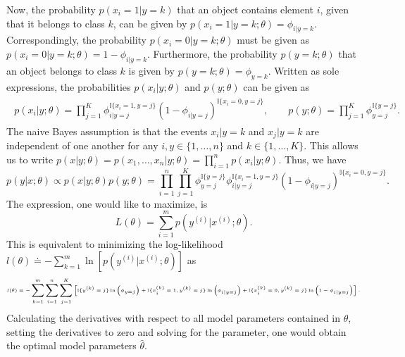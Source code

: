 \documentclass[a4paper,11pt]{article}
\numberwithin{equation}{section}
\begin{document}
{Now, the probability $p(x_i = 1|y=k)$ that an object contains element $i$, given that it belongs to class $k$, can be given by $p(x_i=1|y=k;\theta) = \phi_{i|y=k}$. Correspondingly, the probability $p(x_i=0|y=k;\theta)$ must be given as $p(x_i=0|y=k;\theta) = 1-\phi_{i|y=k}$. Furthermore, the probability $p(y=k;\theta)$ that an object belongs to class $k$ is given by $p(y=k;\theta) = \phi_{y=k}$. Written as sole expressions, the probabilities $p(x_i|y;\theta)$ and $p(y;\theta)$ can be given as \begin{align}
	\begin{aligned}
		p(x_i|y;\theta) = \prod_{j=1}^{K}\phi_{i|y=j}^{\mathbb{I}\{x_i=1, y=j\}}(1-\phi_{i|y=j})^{\mathbb{I}\{x_i=0, y=j\}}, \qquad
		p(y;\theta) = \prod_{j=1}^{K}\phi_{y=j}^{\mathbb{I}\{y=j\}}.
	\end{aligned}
\end{align} The naive Bayes assumption is that the events $x_i|y=k$ and $x_j|y=k$ are independent of one another for any $i,y\in\{1,\dots,n\}$ and $k\in\{1,\dots,K\}$. This allows us to write $p(x|y; \theta) = p(x_1,\dots,x_n|y;\theta) = \prod_{i=1}^{n}p(x_i|y;\theta)$. Thus, we have \begin{equation}
p(y|x;\theta) \propto p(x|y;\theta)p(y;\theta) = \prod_{i=1}^{n}\prod_{j=1}^{K}\phi_{y=j}^{\mathbb{I}\{y=j\}}\phi_{i|y=j}^{\mathbb{I}\{x_i=1, y=j\}}(1-\phi_{i|y=j})^{\mathbb{I}\{x_i=0, y=j\}}.
\end{equation} The expression, one would like to maximize, is \begin{equation}
L(\theta) = \sum_{i=1}^{m}p(y^{(i)}|x^{(i)};\theta).
\end{equation} This is equivalent to minimizing the log-likelihood $l(\theta) \doteq - \sum_{k=1}^{m}\ln\left[p(y^{(i)}|x^{(i)};\theta)\right]$ as \begin{align}\tiny\begin{aligned}
l(\theta) = -\sum_{k=1}^{m}\sum_{i=1}^{n}\sum_{j=1}^{K}\left[\mathbb{I}\{y^{(k)}=j\}\ln\left(\phi_{y=j}\right) + \mathbb{I}\{x_i^{(k)}=1,y^{(k)}=j\}\ln\left(\phi_{i|y=j}\right)+ \mathbb{I}\{x_i^{(k)}=0,y^{(k)}=j\}\ln\left(1-\phi_{i|y=j}\right)\right].
\end{aligned}\end{align} Calculating the derivatives with respect to all model parameters contained in $\theta$, setting the derivatives to zero and solving for the parameter, one would obtain the optimal model parameters $\hat{\theta}$.

}
\end{document}

